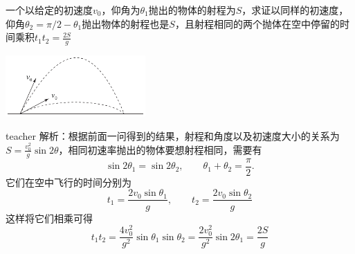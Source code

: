 \begin{example}
一个以给定的初速度$v_0$，仰角为$\theta_1$抛出的物体的射程为$S$，求证以同样的初速度，仰角$\theta_2 = \pi/2-\theta_1$抛出物体的射程也是$S$，且射程相同的两个抛体在空中停留的时间乘积$t_1t_2 = \frac{2S}{g}$
\begin{flushright}
\includegraphics[width = 0.4\textwidth]{images/motion-33.pdf} 
\end{flushright}
\begin{taggedblock}{teacher}
\noindent
解析：根据前面一问得到的结果，射程和角度以及初速度大小的关系为$S = \frac{v_0^2}{g}\sin 2\theta$，相同初速率抛出的物体要想射程相同，需要有
\[
\sin 2\theta_1 = \sin 2\theta_2,\qquad \theta_1+\theta_2 = \frac{\pi}{2}.
\]
它们在空中飞行的时间分别为
\[
t_1 = \frac{2v_0\sin\theta_1}{g},\qquad t_2 = \frac{2v_0\sin\theta_2}{g}
\]
这样将它们相乘可得
\[t_1t_2 = \frac{4v_0^2}{g^2}\sin\theta_1\sin\theta_2 = \frac{2v_0^2}{g^2}\sin 2\theta_1 = \frac{2S}{g}\]
\end{taggedblock}
\end{example}



%



